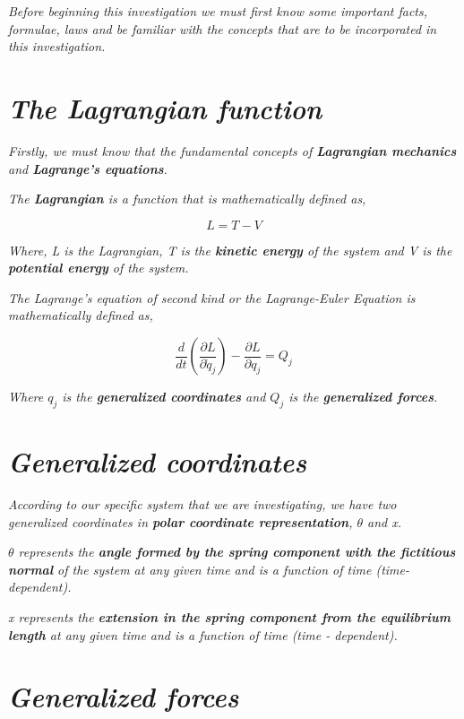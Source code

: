 \textit{Before beginning this investigation we must first know some important facts, formulae, laws and be familiar with the concepts that are to be incorporated in this investigation.}

\section{\textit{The Lagrangian function}}
        
    \textit{Firstly, we must know that the fundamental concepts of \textbf{Lagrangian mechanics} and \textbf{Lagrange's equations}.}
        
    \textit{The \textbf{Lagrangian} is a function that is mathematically defined as,}
        
    $$L = T - V$$
        
    \textit{Where, L is the Lagrangian, T is the \textbf{kinetic energy} of the system and V is the \textbf{potential energy} of the system.}
        
    \textit{The Lagrange's equation of second kind or the Lagrange-Euler Equation is mathematically defined as,}
        
    $$\frac{d}{dt}\left(\frac{\partial L}{\partial \dot{q}_j}\right) - \frac{\partial L}{\partial q_j} = Q_j$$
        
    \textit{Where $q_j$ is the \textbf{generalized coordinates} and $Q_j$ is the \textbf{generalized forces}.}
      
    \section{\textit{Generalized coordinates}}
        
    \textit{According to our specific system that we are investigating, we have two generalized coordinates in \textbf{polar coordinate representation}, $\theta$ and x.}
        
    \textit{$\theta$ represents the \textbf{angle formed by the spring component with the fictitious normal} of the system at any given time and is a function of time (time-dependent).}
        
    \textit{x represents the \textbf{extension in the spring component from the equilibrium length} at any given time and is a function of time (time - dependent).}
            
    \section{\textit{Generalized forces}}
        
